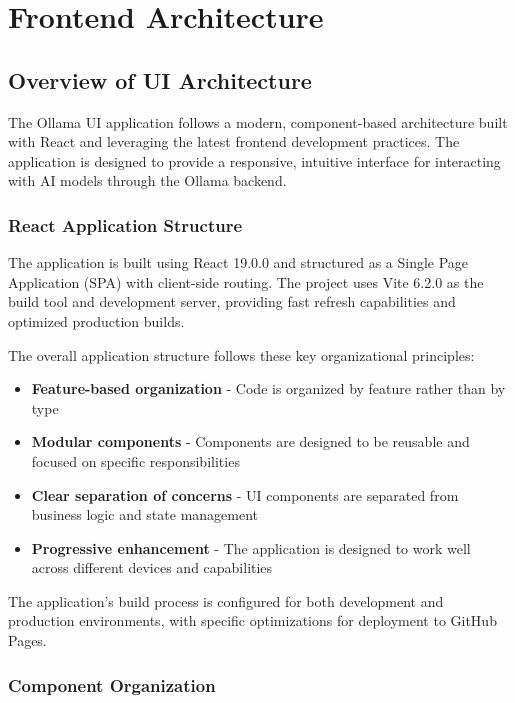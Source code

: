 \chapter{Frontend Architecture} \label{ch:frontend-architecture}

\section{Overview of UI Architecture}

The Ollama UI application follows a modern, component-based architecture built with React and leveraging the latest frontend development practices. The application is designed to provide a responsive, intuitive interface for interacting with AI models through the Ollama backend.

\subsection{React Application Structure}

The application is built using React 19.0.0 and structured as a Single Page Application (SPA) with client-side routing. The project uses Vite 6.2.0 as the build tool and development server, providing fast refresh capabilities and optimized production builds.

The overall application structure follows these key organizational principles:

\begin{itemize}
  \item \textbf{Feature-based organization} - Code is organized by feature rather than by type
  \item \textbf{Modular components} - Components are designed to be reusable and focused on specific responsibilities
  \item \textbf{Clear separation of concerns} - UI components are separated from business logic and state management
  \item \textbf{Progressive enhancement} - The application is designed to work well across different devices and capabilities
\end{itemize}

The application's build process is configured for both development and production environments, with specific optimizations for deployment to GitHub Pages.

\subsection{Component Organization}

